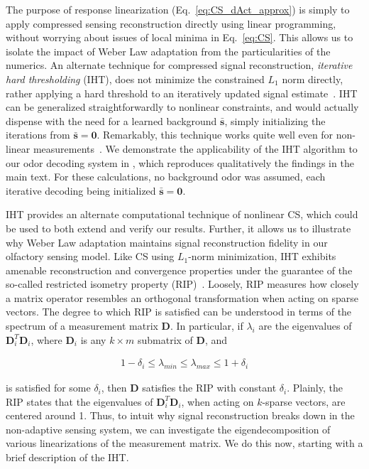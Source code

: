 \documentclass[9pt,lineno]{elife}
\begin{document}
The purpose of response linearization (Eq.~\ref{eq:CS_dAct_approx}) is simply to apply compressed sensing reconstruction directly using linear programming, without worrying about issues of local minima in Eq.~\ref{eq:CS}. This allows us to isolate the impact  of Weber Law adaptation from the particularities of the numerics. An alternate technique for compressed signal reconstruction, \textit{iterative hard thresholding} (IHT), does not minimize the constrained $L_1$ norm directly, rather applying a hard threshold to an iteratively updated signal estimate~\citep{IHT}. IHT can be generalized straightforwardly to nonlinear constraints, and would actually dispense with the need for a learned background $\bar{\mathbf s}$, simply initializing the iterations from $\bar{\mathbf s} = \mathbf 0$. Remarkably, this technique works quite well even for non-linear measurements~\citep{nonlin_CS}. We demonstrate the applicability of the IHT algorithm to our odor decoding system in , which reproduces qualitatively the findings in the main text. For these calculations, no background odor was assumed, each iterative decoding being initialized $\bar {\mathbf s} = \mathbf {0}$.

IHT provides an alternate computational technique of nonlinear CS, which could be used to both extend and verify our results. Further, it allows us to illustrate why Weber Law adaptation maintains signal reconstruction fidelity in our olfactory sensing model. Like CS using $L_1$-norm minimization, IHT exhibits amenable reconstruction and convergence properties under the guarantee of the so-called restricted isometry property (RIP)~\citep{CS_tao_2}. Loosely, RIP measures how closely a matrix operator resembles an orthogonal transformation when acting on sparse vectors. The degree to which RIP is satisfied can be understood in terms of the spectrum of a measurement matrix $\mathbf D$. In particular, if $\lambda_i$ are the eigenvalues of $\mathbf {D}_i^T\mathbf {D}_i$, where $\mathbf D_i$ is any $k \times m$ submatrix of $\mathbf D$, and 

\begin{align}
1 - \delta_i \leq \lambda_{min} \leq \lambda_{max} \leq 1 + \delta_i
\end{align}

is satisfied for some $\delta_i$, then $\mathbf D$ satisfies the RIP with constant $\delta_i$. Plainly, the RIP states that the eigenvalues of $\mathbf {D}_i^T\mathbf {D}_i$, when acting on $k$-sparse vectors, are centered around 1. Thus, to intuit why signal reconstruction breaks down in the non-adaptive sensing system, we can investigate the eigendecomposition of various linearizations of the measurement matrix. We do this now, starting with a brief description of the IHT.
\end{document}
